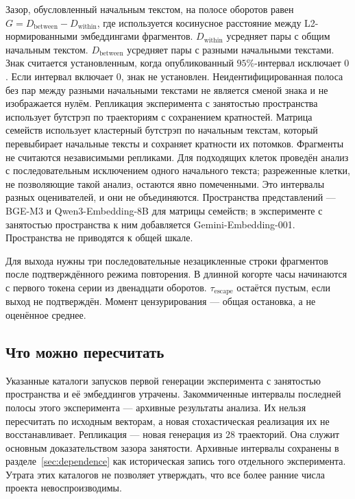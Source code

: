 \documentclass[10pt]{article}
\begin{document}
Зазор, обусловленный начальным текстом, на полосе оборотов равен
$G = D_{\mathrm{between}} - D_{\mathrm{within}}$,
где используется косинусное расстояние между L2-нормированными
эмбеддингами фрагментов.
$D_{\mathrm{within}}$ усредняет пары с общим начальным текстом.
$D_{\mathrm{between}}$ усредняет пары с разными начальными текстами.
Знак считается установленным, когда опубликованный $95\%$-интервал
исключает $0$.
Если интервал включает $0$, знак не установлен.
Неидентифицированная полоса без пар между разными начальными текстами
не является сменой знака и не изображается нулём.
Репликация эксперимента с занятостью пространства использует
бутстрэп по траекториям с сохранением кратностей. %
Матрица семейств использует кластерный бутстрэп по начальным текстам,
который перевыбирает начальные тексты и сохраняет кратности их потомков.
Фрагменты не считаются независимыми репликами.
Для подходящих клеток проведён анализ с последовательным исключением
одного начального текста; разреженные клетки, не позволяющие такой анализ,
остаются явно помеченными. %
Это интервалы разных оценивателей, и они не объединяются.
Пространства представлений --- BGE-M3 и Qwen3-Embedding-8B
для матрицы семейств; в эксперименте с занятостью пространства
к ним добавляется Gemini-Embedding-001.
Пространства не приводятся к общей шкале.

Для выхода нужны три последовательные незацикленные строки фрагментов
после подтверждённого режима повторения. %
В длинной когорте часы начинаются с первого токена серии
из двенадцати оборотов.
$\tau_{\mathrm{escape}}$ остаётся пустым, если выход не подтверждён.
Момент цензурирования --- общая остановка, а не оценённое среднее.

\subsection{Что можно пересчитать}
\label{sec:archival}

Указанные каталоги запусков первой генерации эксперимента с занятостью
пространства и её эмбеддингов утрачены. %
Закоммиченные интервалы последней полосы этого эксперимента ---
архивные результаты анализа.
Их нельзя пересчитать по исходным векторам,
а новая стохастическая реализация их не восстанавливает.
Репликация --- новая генерация из $28$ траекторий. %
Она служит основным доказательством зазора занятости.
Архивные интервалы сохранены в разделе~\ref{sec:dependence}
как историческая запись того отдельного эксперимента.
Утрата этих каталогов не позволяет утверждать, что все более ранние
числа проекта невоспроизводимы.
\end{document}
